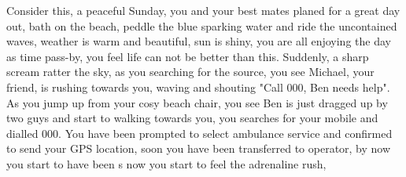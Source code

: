 Consider this, a peaceful Sunday, you and your best mates planed for a great day out, bath on the beach, peddle the blue sparking water and ride the uncontained waves, weather is warm and beautiful, sun is shiny, you are all enjoying the day as time pass-by, you feel life can not be better than this. Suddenly, a sharp scream ratter the sky, as you searching for the source, you see Michael, your friend, is rushing towards you, waving and shouting "Call 000, Ben needs help". As you jump up from your cosy beach chair, you see Ben is just dragged up by two guys and start to walking towards you, you searches for your mobile and dialled 000. You have been prompted to select ambulance service and confirmed to send your GPS location, soon you have been transferred to operator, by now you start to have been s now you start to feel the adrenaline rush,  